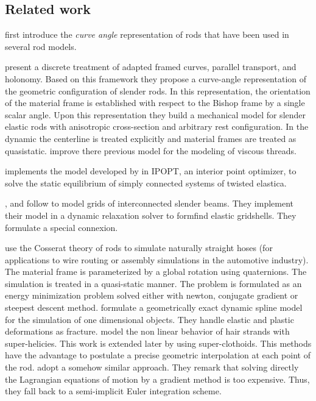\subsection{Related work}

 first introduce the \emph{curve angle} representation of rods that have been used in several  rod models.

 present a discrete treatment of adapted framed curves, parallel transport, and holonomy. Based on this framework they propose a curve-angle representation of the geometric configuration of slender rods. In this representation, the orientation of the material frame is established with respect to the Bishop frame by a single scalar angle. Upon this representation they build a mechanical model for slender elastic rods with anisotropic cross-section and arbitrary rest configuration. In the dynamic the centerline is treated explicitly and material frames are treated as quasistatic.  improve there previous model for the modeling of viscous threads.

 implements the model developed by \cite{Bergou2008} in IPOPT, an interior point optimizer, to solve the static equilibrium of simply connected systems of twisted elastica.

,  and  follow \cite{Bergou2008} to model grids of interconnected slender beams. They implement their model in a dynamic relaxation solver to formfind elastic gridshells. They formulate a special connexion.

 use the Cosserat theory of rods to simulate naturally straight hoses (for applications to wire routing or assembly simulations in the automotive industry). The material frame is parameterized by a global rotation using quaternions. The simulation is treated in a quasi-static manner. The problem is formulated as an energy minimization problem solved either with newton, conjugate gradient or steepest descent method.  formulate a geometrically exact dynamic spline model for the simulation of one dimensional objects. They handle elastic and plastic deformations as fracture.  model the non linear behavior of hair strands with super-helicies. This work is extended later by  using super-clothoids. This methods have the advantage to postulate a precise geometric interpolation at each point of the rod.  adopt a somehow similar approach. They remark that solving directly the Lagrangian equations of motion by a gradient method is too expensive. Thus, they fall back to a semi-implicit Euler integration scheme.


